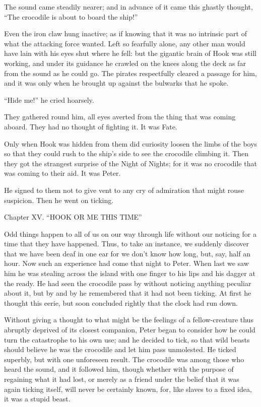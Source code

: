 The sound came steadily nearer; and in advance of it came this ghastly
thought, ``The crocodile is about to board the ship!''

Even the iron claw hung inactive; as if knowing that it was no
intrinsic part of what the attacking force wanted. Left so fearfully
alone, any other man would have lain with his eyes shut where he fell:
but the gigantic brain of Hook was still working, and under its
guidance he crawled on the knees along the deck as far from the sound
as he could go. The pirates respectfully cleared a passage for him, and
it was only when he brought up against the bulwarks that he spoke.

``Hide me!'' he cried hoarsely.

They gathered round him, all eyes averted from the thing that was
coming aboard. They had no thought of fighting it. It was Fate.

Only when Hook was hidden from them did curiosity loosen the limbs of
the boys so that they could rush to the ship's side to see the
crocodile climbing it. Then they got the strangest surprise of the
Night of Nights; for it was no crocodile that was coming to their aid.
It was Peter.

He signed to them not to give vent to any cry of admiration that might
rouse suspicion. Then he went on ticking.




Chapter XV.
``HOOK OR ME THIS TIME''


Odd things happen to all of us on our way through life without our
noticing for a time that they have happened. Thus, to take an instance,
we suddenly discover that we have been deaf in one ear for we don't
know how long, but, say, half an hour. Now such an experience had come
that night to Peter. When last we saw him he was stealing across the
island with one finger to his lips and his dagger at the ready. He had
seen the crocodile pass by without noticing anything peculiar about it,
but by and by he remembered that it had not been ticking. At first he
thought this eerie, but soon concluded rightly that the clock had run
down.

Without giving a thought to what might be the feelings of a
fellow-creature thus abruptly deprived of its closest companion, Peter
began to consider how he could turn the catastrophe to his own use; and
he decided to tick, so that wild beasts should believe he was the
crocodile and let him pass unmolested. He ticked superbly, but with one
unforeseen result. The crocodile was among those who heard the sound,
and it followed him, though whether with the purpose of regaining what
it had lost, or merely as a friend under the belief that it was again
ticking itself, will never be certainly known, for, like slaves to a
fixed idea, it was a stupid beast.

